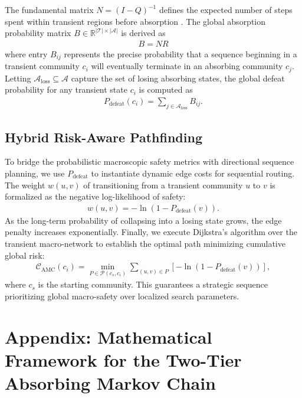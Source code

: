 \documentclass[9pt,twocolumn,twoside]{pnas-report}
\begin{document}
The fundamental matrix $N = (I - Q)^{-1}$ defines the expected number of steps spent within transient regions before absorption \cite{markov_chains}. The global absorption probability matrix $B \in \mathbb{R}^{|\mathcal{T}| \times |\mathcal{A}|}$ is derived as
\begin{align}
    B = N R
    \label{B_matrix}
\end{align}
where entry $B_{ij}$ represents the precise probability that a sequence beginning in a transient community $c_i$ will eventually terminate in an absorbing community $c_j$. Letting $\mathcal{A}_{\text{loss}} \subseteq \mathcal{A}$ capture the set of losing absorbing states, the global defeat probability for any transient state $c_i$ is computed as
\begin{align}
    P_{\text{defeat}}(c_i) = \sum_{j \in \mathcal{A}_{\text{loss}}} B_{ij}.
    \label{P_defeat}
\end{align}

\subsection*{Hybrid Risk-Aware Pathfinding}
To bridge the probabilistic macroscopic safety metrics with directional sequence planning, we use $P_{\text{defeat}}$ to instantiate dynamic edge costs for sequential routing. The weight $w(u, v)$ of transitioning from a transient community $u$ to $v$ is formalized as the negative log-likelihood of safety:
\begin{align}
    w(u, v) = -\ln\left(1 - P_{\text{defeat}}(v)\right).
    \label{w_amc}
\end{align}
As the long-term probability of collapsing into a losing state grows, the edge penalty increases exponentially. Finally, we execute Dijkstra's algorithm over the transient macro-network to establish the optimal path minimizing cumulative global risk:
\begin{align}
    \mathcal{C}_{\text{AMC}}(c_i) = \min_{P \in \mathcal{P}(c_s, c_i)} \sum_{(u, v) \in P} \left[ -\ln(1 - P_{\text{defeat}}(v)) \right],
    \label{C_amc}
\end{align}
where $c_s$ is the starting community. This guarantees a strategic sequence prioritizing global macro-safety over localized search parameters.



\clearpage

\section*{Appendix: Mathematical Framework for the Two-Tier Absorbing Markov Chain}
\label{sec:appendix}
\end{document}
